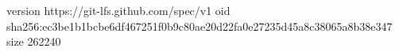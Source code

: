 version https://git-lfs.github.com/spec/v1
oid sha256:ec3be1b1bcbe6df467251f0b9c80ae20d22fa0e27235d45a8c38065a8b38e347
size 262240

